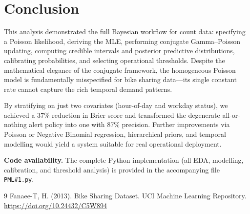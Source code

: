 \documentclass[12pt]{article}
\begin{document}
\section{Conclusion}

This analysis demonstrated the full Bayesian workflow for count data:
specifying a Poisson likelihood, deriving the MLE, performing
conjugate Gamma--Poisson updating, computing credible intervals and
posterior predictive distributions, calibrating probabilities, and
selecting operational thresholds.  Despite the mathematical elegance
of the conjugate framework, the homogeneous Poisson model is
fundamentally misspecified for bike sharing data---its single
constant rate cannot capture the rich temporal demand patterns.

By stratifying on just two covariates (hour-of-day and workday
status), we achieved a 37\% reduction in Brier score and transformed
the degenerate all-or-nothing alert policy into one with 87\%
precision.  Further improvements via Poisson or Negative Binomial
regression, hierarchical priors, and temporal modelling would yield
a system suitable for real operational deployment.

\medskip
\noindent\textbf{Code availability.}  The complete Python implementation
(all EDA, modelling, calibration, and threshold analysis) is provided
in the accompanying file \texttt{PML\#1.py}.


\begin{thebibliography}{9}
Fanaee-T, H. (2013).
\newblock Bike Sharing Dataset.
\newblock UCI Machine Learning Repository.
\newblock \url{https://doi.org/10.24432/C5W894}
\end{thebibliography}
\end{document}
